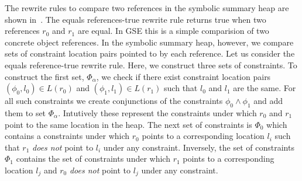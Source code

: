 \newsavebox{\boxPEX}




The rewrite rules to compare two references in the symbolic summary
heap are shown in~. The equals references-true rewrite
rule returns true when two references $r_0$ and $r_1$ are equal. In
GSE this is a simple comparision of two concrete object references. In
the symbolic summary heap, however, we compare sets of constraint
location pairs pointed to by each reference. Let us consider the
equals reference-true rewrite rule. Here, we construct three sets of
constraints. To construct the first set, $\Phi_\alpha$, we check if
there exist constraint location pairs $(\phi_0, l_0) \in L(r_0)$ and
$(\phi_1, l_1) \in L(r_1)$ such that $l_0$ and $l_1$ are the same.
For all such constraints we create conjunctions of the constraints
$\phi_0 \wedge \phi_1$ and add them to set $\Phi_\alpha$. Intutively
these represent the constraints under which $r_0$ and $r_1$ point to
the same location in the heap. The next set of constraints is $\Phi_0$
which contains a constraints under which $r_0$ points to a
corresponding location $l_i$ such that $r_1$ \emph{does not} point to
$l_i$ under any constraint. Inversely, the set of constraints $\Phi_1$
contains the set of constraints under which $r_1$ points to a
corresponding location $l_j$ and $r_0$ \emph{does not} point to $l_j$
under any constraint.

